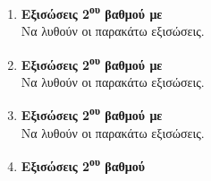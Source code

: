 \documentclass[twoside,nofonts,internet]{askhseis}
\newcommand{\tss}[1]{\textsuperscript{#1}}
\begin{document}
\begin{enumerate}
\item \textbf{Εξισώσεις 2\tss{ου} βαθμού με {}}\\
Να λυθούν οι παρακάτω εξισώσεις.
\begin{multicols}{2}
\end{multicols}
\item \textbf{Εξισώσεις 2\tss{ου} βαθμού με {}}\\
Να λυθούν οι παρακάτω εξισώσεις.
\begin{multicols}{2}
\end{multicols}
\item \textbf{Εξισώσεις 2\tss{ου} βαθμού με {}}\\
Να λυθούν οι παρακάτω εξισώσεις.
\begin{multicols}{2}
\end{multicols}
\item \textbf{Εξισώσεις 2\tss{ου} βαθμού}\\

\end{enumerate}
\end{document}
